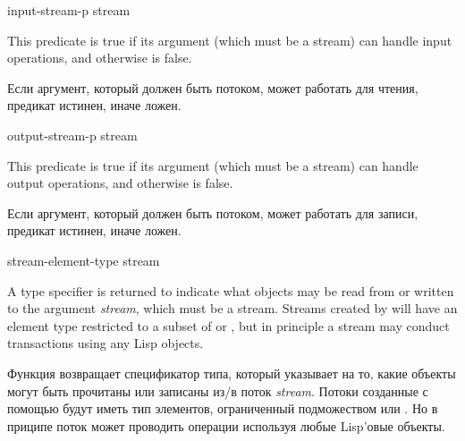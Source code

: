 \begin{defun}[Function]
input-stream-p stream

This predicate is true if its argument (which must be a stream) can handle
input operations, and otherwise is false.

Если аргумент, который должен быть потоком, может работать для чтения, предикат
истинен, иначе ложен.
\end{defun}

\begin{defun}[Function]
output-stream-p stream

This predicate is true if its argument (which must be a stream) can handle
output operations, and otherwise is false.

Если аргумент, который должен быть потоком, может работать для записи, предикат
истинен, иначе ложен.
\end{defun}


\begin{defun}[Function]
stream-element-type stream

A type specifier is returned to indicate what objects
may be read from or written to the argument \emph{stream}, which must be a stream.
Streams created by  will have an element type
restricted to a subset of  or ,
but in principle a stream may conduct transactions using any
Lisp objects.

Функция возвращает спецификатор типа, который указывает на то, какие объекты
могут быть прочитаны или записаны из/в поток \emph{stream}.
Потоки созданные с помощью  будут иметь тип элементов, ограниченный
подможеством  или . Но в приципе поток может
проводить операции используя любые Lisp'овые объекты.
\end{defun}

